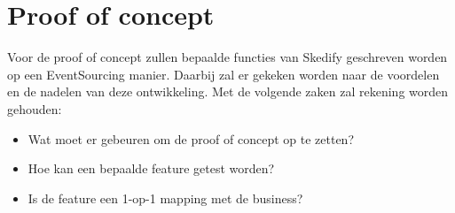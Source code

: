 \section{Proof of concept}
\label{sec:proof-of-concept}

Voor de proof of concept zullen bepaalde functies van Skedify geschreven worden op een EventSourcing manier. Daarbij zal er gekeken worden naar de voordelen en de nadelen van deze ontwikkeling. Met de volgende zaken zal rekening worden gehouden:

\begin{itemize}
  \item{Wat moet er gebeuren om de proof of concept op te zetten?}
  \item{Hoe kan een bepaalde feature getest worden?}
  \item{Is de feature een 1-op-1 mapping met de business?}
\end{itemize}
